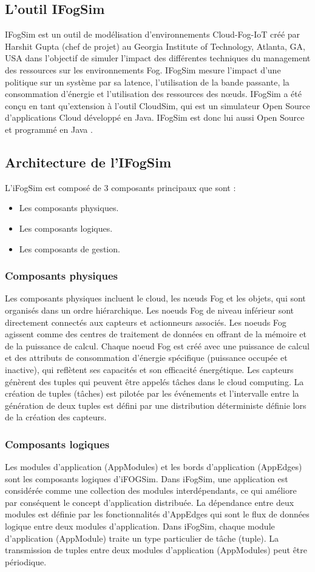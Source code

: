 \subsection{L’outil IFogSim}
IFogSim est un outil de modélisation d’environnements Cloud-Fog-IoT créé par
Harshit Gupta (chef de projet) au Georgia Institute of Technology, Atlanta, GA, USA dans l’objectif de simuler l’impact des différentes techniques du management des ressources sur les environnements Fog. IFogSim mesure l’impact d’une politique sur un système par sa latence, l’utilisation de la bande passante, la consommation d’énergie et l’utilisation des ressources des nœuds. IFogSim a été conçu en tant qu’extension à l’outil CloudSim, qui est un simulateur Open Source d’applications Cloud développé en Java. IFogSim est donc lui aussi Open Source et programmé en Java .
\subsection{Architecture de l’IFogSim}
L’iFogSim est composé de 3 composants principaux que sont : 
\begin{itemize}
    \item Les composants physiques.
    \item Les composants logiques.
    \item Les composants de gestion.
\end{itemize}
\subsubsection{Composants physiques}
Les composants physiques incluent le cloud, les nœuds Fog et les objets, qui sont organisés dans un ordre hiérarchique. Les noeuds Fog de niveau inférieur sont directement connectés aux capteurs et actionneurs associés. Les noeuds Fog agissent comme des centres de traitement de données en offrant de la mémoire et de la puissance de calcul. Chaque noeud Fog est créé avec une puissance de calcul et des attributs de consommation d'énergie spécifique (puissance occupée et inactive), qui reflètent ses capacités et son efficacité énergétique. Les capteurs génèrent des tuples qui peuvent être appelés tâches dans le cloud computing. La création de tuples (tâches) est pilotée par les événements et l'intervalle entre la génération de deux tuples est défini par une distribution déterministe définie lors de la création des capteurs.
\subsubsection{Composants logiques}
Les modules d'application (AppModules) et les bords d'application (AppEdges) sont les composants logiques d'iFOGSim. Dans iFogSim, une application est considérée comme une collection des modules interdépendants, ce qui améliore par conséquent le concept d'application distribuée. La dépendance entre deux modules est définie par les fonctionnalités d'AppEdges qui sont le flux de données logique entre deux modules d’application. Dans iFogSim, chaque module d’application (AppModule) traite un type particulier de tâche (tuple). La transmission de tuples entre deux modules d’application (AppModules) peut être périodique.
